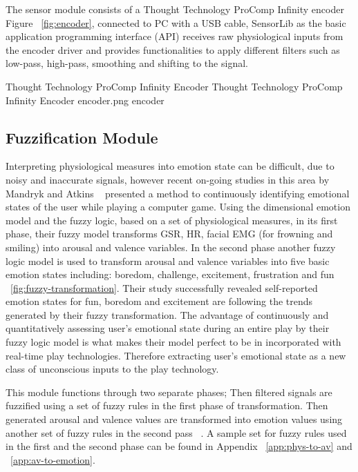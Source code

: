 The sensor module consists of a Thought Technology ProComp Infinity encoder ~\cite{tt2013procomp} Figure ~\ref{fig:encoder}, connected to PC with a USB cable, SensorLib as the basic application programming interface (API) receives raw physiological inputs from the encoder driver and provides functionalities to apply different filters such as low-pass, high-pass, smoothing and shifting to the signal.

\img
{Thought Technology ProComp Infinity Encoder}
{Thought Technology ProComp Infinity Encoder}
{encoder.png}
{encoder}

\subsection{Fuzzification Module} \label{subsec:fuzzi}
Interpreting physiological measures into emotion state can be difficult, due to noisy and inaccurate signals, however recent on-going studies in this area by Mandryk and Atkins ~\cite{mandryk2007fuzzy} presented a method to continuously identifying emotional states of the user while playing a computer game. Using the dimensional emotion model and the fuzzy logic, based on a set of physiological measures, in its first phase, their fuzzy model transforms GSR, HR, facial EMG (for frowning and smiling) into arousal and valence variables. In the second phase another fuzzy logic model is used to transform arousal and valence variables into five basic emotion states including: boredom, challenge, excitement, frustration and fun ~\ref{fig:fuzzy-transformation}. Their study successfully revealed self-reported emotion states for fun, boredom and excitement are following the trends generated by their fuzzy transformation. The advantage of continuously and quantitatively assessing user's emotional state during an entire play by their fuzzy logic model is what makes their model perfect to be in incorporated with real-time play technologies. Therefore extracting user's emotional state as a new class of unconscious inputs to the play technology.

This module functions through two separate phases; Then filtered signals are fuzzified using a set of fuzzy rules in the first phase of transformation. Then generated arousal and valence values are transformed into emotion values using another set of fuzzy rules in the second pass ~\cite{mandryk2007fuzzy}. A sample set for fuzzy rules used in the first and the second phase can be found in Appendix ~\ref{app:phys-to-av} and ~\ref{app:av-to-emotion}.

